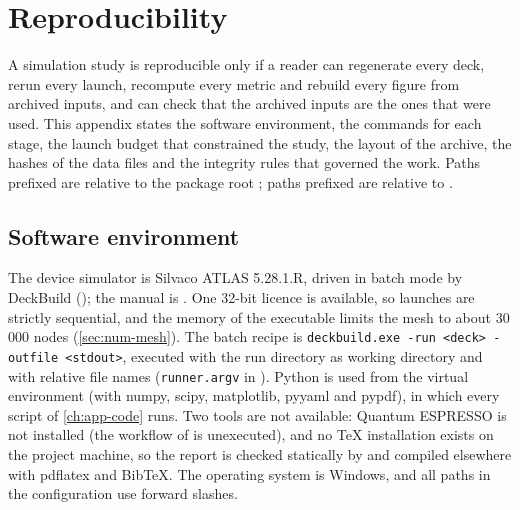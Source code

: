 \chapter{Reproducibility}\label{ch:app-repro}

A simulation study is reproducible only if a reader can regenerate every deck, rerun every launch, recompute every
metric and rebuild every figure from archived inputs, and can check that the archived inputs are the ones that were used.
This appendix states the software environment, the commands for each stage, the launch budget that constrained the
study, the layout of the archive, the hashes of the data files and the integrity rules that governed the work. Paths
prefixed  are relative to the package root ; paths prefixed
 are relative to .

\section{Software environment}\label{sec:repro-env}

The device simulator is Silvaco ATLAS 5.28.1.R, driven in batch mode by DeckBuild
(); the manual is 
\citep{AtlasManual}. One 32-bit licence is available, so launches are strictly sequential, and the memory of the
executable limits the mesh to about 30\,000 nodes (\cref{sec:num-mesh}). The batch recipe is
\texttt{deckbuild.exe -run <deck> -outfile <stdout>}, executed with the run directory as working directory and with
relative file names (\texttt{runner.argv} in ). Python is used from the virtual environment
 (with numpy, scipy, matplotlib, pyyaml and pypdf), in which every script of
\cref{ch:app-code} runs. Two tools are not available: Quantum ESPRESSO is not installed (the workflow of
 is unexecuted), and no TeX installation exists on the project machine, so the report is
checked statically by  and compiled elsewhere with pdflatex and BibTeX. The operating system is
Windows, and all paths in the configuration use forward slashes.


